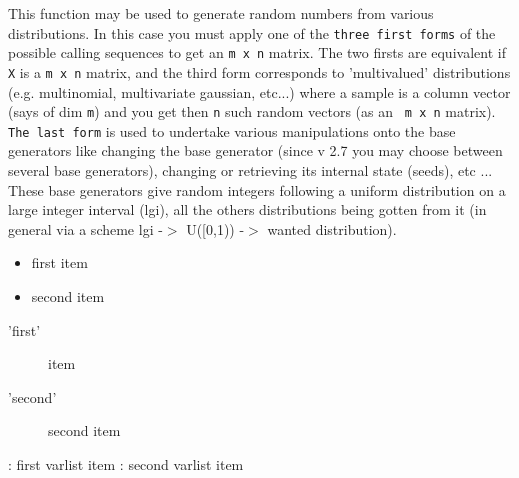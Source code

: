 \begin{mandescription}
  This function may be used to generate random numbers from various
  distributions. In this case you must apply one of the \verb!three first forms!
  of the possible calling sequences to get an \verb!m x n! matrix.  The two
  firsts are equivalent if \verb!X! is a \verb!m x n! matrix, and the third form
  corresponds to 'multivalued' distributions (e.g. multinomial, multivariate
  gaussian, etc...) where a sample is a column vector (says of dim \verb!m!)
  and you get then \verb!n! such random vectors (as an \verb! m x n! matrix).
  \verb!The last form! is used to undertake various manipulations onto the base
  generators like changing the base generator (since v 2.7 you may choose
  between several base generators), changing or retrieving its internal state
  (seeds), etc ... These base generators give random integers following a
  uniform distribution on a large integer interval (lgi), all the others
  distributions being gotten from it (in general via a scheme lgi -$>$ U([0,1))
  -$>$ wanted distribution).

  \begin{itemize}
  \item first item 
  \item second item 
  \end{itemize}

  \begin{description}
  \item['first'] item 
  \item['second'] second item 
  \end{description}

  \begin{varlist}
    : first varlist item 
    : second varlist item
  \end{varlist}


\end{mandescription}

